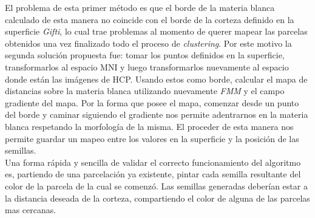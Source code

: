 El problema de esta primer m\'etodo es que el borde de la materia blanca calculado
de esta manera no coincide con el borde de la corteza definido en la superficie
\textit{Gifti}, lo cual trae problemas al momento de querer mapear las parcelas
obtenidos una vez finalizado todo el proceso de \textit{clustering}. Por este
motivo la segunda soluci\'on propuesta fue: tomar los puntos definidos en la 
superficie, transformarlos al espacio MNI y luego transformarlos nuevamente al 
espacio donde est\'an las im\'agenes de HCP. Usando estos como borde, calcular 
el mapa de distancias sobre la materia blanca utilizando nuevamente \textit{FMM}
y el campo gradiente del mapa. Por la forma que posee el mapa, comenzar desde un
punto del borde y caminar siguiendo el gradiente nos permite adentrarnos en la 
materia blanca respetando la morfolog\'ia de la misma. El proceder de esta manera
nos permite guardar un mapeo entre los valores en la superficie y la posici\'on
de las semillas.\\

Una forma r\'apida y sencilla de validar el correcto funcionamiento del algoritmo
es, partiendo de una parcelaci\'on ya existente, pintar cada semilla resultante 
del color de la parcela de la cual se comenz\'o. Las semillas generadas deber\'ian
estar a la distancia deseada de la corteza, compartiendo el color de alguna de
las parcelas mas cercanas.\\
